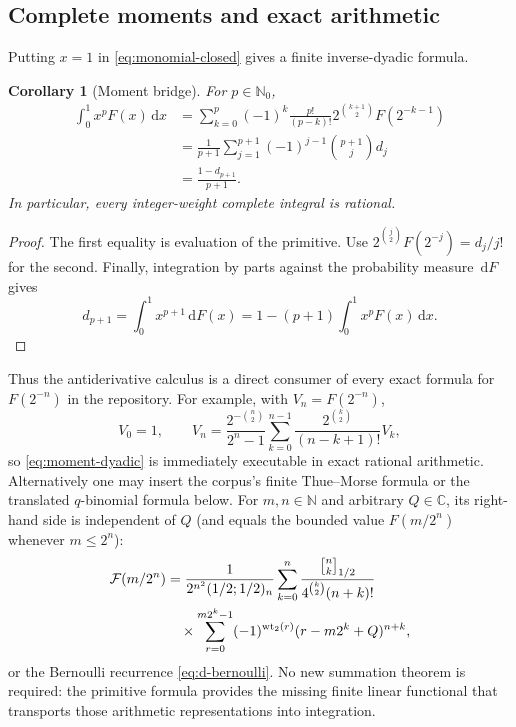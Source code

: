 \documentclass[11pt,oneside]{article}
\numberwithin{equation}{section}
\newtheorem{corollary}[theorem]{Corollary}
\theoremstyle{definition}
\theoremstyle{remark}
\newcommand{\C}{\mathbb C}
\newcommand{\N}{\mathbb N}
\newcommand{\dd}{\,\mathrm d}
\newcommand{\wt}{\operatorname{wt}_2}
\newcommand{\qbinom}[3]{\genfrac{[}{]}{0pt}{}{#1}{#2}_{#3}}
\begin{document}
\subsection{Complete moments and exact arithmetic}
Putting $x=1$ in \eqref{eq:monomial-closed} gives a finite inverse-dyadic
formula.

\begin{corollary}[Moment bridge]
\label{cor:moment-bridge}
For $p\in\N_0$,
\begin{align}
 \int_0^1x^pF(x)\dd x
 &=\sum_{k=0}^{p}(-1)^k\frac{p!}{(p-k)!}
 2^{\binom{k+1}{2}}F(2^{-k-1})                             \label{eq:moment-dyadic}\\
 &=\frac1{p+1}\sum_{j=1}^{p+1}(-1)^{j-1}
   \binom{p+1}{j}d_j                                      \label{eq:moment-d}\\
 &=\boxed{\frac{1-d_{p+1}}{p+1}}.                         \label{eq:moment-prob}
\end{align}
In particular, every integer-weight complete integral is rational.
\end{corollary}

\begin{proof}
The first equality is evaluation of the primitive.  Use
$2^{\binom j2}F(2^{-j})=d_j/j!$ for the second.  Finally, integration by parts
against the probability measure $\dd F$ gives
\[
 d_{p+1}=\int_0^1x^{p+1}\dd F(x)
 =1-(p+1)\int_0^1x^pF(x)\dd x.
\]
\end{proof}

Thus the antiderivative calculus is a direct consumer of every exact formula
for $F(2^{-n})$ in the repository.  For example, with $V_n=F(2^{-n})$,
\begin{equation}
 V_0=1,\qquad
 V_n=\frac{2^{-\binom n2}}{2^n-1}
 \sum_{k=0}^{n-1}\frac{2^{\binom k2}}{(n-k+1)!}V_k,       \label{eq:V-recurrence}
\end{equation}
so \eqref{eq:moment-dyadic} is immediately executable in exact rational
arithmetic.  Alternatively one may insert the corpus's finite Thue--Morse
formula or the translated $q$-binomial formula below.  For
$m,n\in\N$ and arbitrary $Q\in\C$, its right-hand side is independent of
$Q$ (and equals the bounded value $F(m/2^n)$ whenever $m\le2^n$):
\begin{align}
 \mathcal F(m/2^n)
 &=\frac{1}{2^{n^2}(1/2;1/2)_n}
 \sum_{k=0}^{n}
 \frac{\qbinom nk{1/2}}{4^{\binom k2}(n+k)!}              \notag\\
 &\quad\times\sum_{r=0}^{m2^k-1}(-1)^{\wt(r)}
 (r-m2^k+Q)^{n+k},                                        \label{eq:q-dyadic-import}
\end{align}
or the Bernoulli recurrence \eqref{eq:d-bernoulli}.  No new summation theorem
is required: the primitive formula provides the missing finite linear
functional that transports those arithmetic representations into integration.
\end{document}
